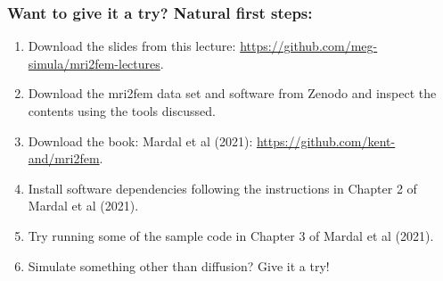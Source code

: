 \documentclass[mathserif, aspectratio=169]{beamer}
\begin{document}
\begin{frame}
\frametitle{Want to give it a try? Natural first steps:}
\begin{enumerate}
\item
  Download the slides from this lecture:  \href{https://github.com/meg-simula/mri2fem-lectures}{https://github.com/meg-simula/mri2fem-lectures}.
\item
  Download the mri2fem data set and software from Zenodo and inspect
  the contents using the tools discussed.
\item
  Download the book: Mardal et al (2021): \href{https://github.com/kent-and/mri2fem}{https://github.com/kent-and/mri2fem}.
\item
  Install software dependencies following the instructions in Chapter
  2 of Mardal et al (2021).
\item
  Try running some of the sample code in Chapter 3 of Mardal et al
  (2021).
\item
  Simulate something other than diffusion? Give it a try!
\end{enumerate}
\end{frame}

\end{document}
